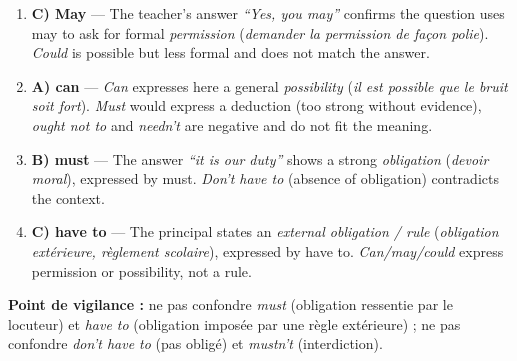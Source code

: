 \documentclass[11pt]{article}
\newcommand{\cle}[1]{{\popxbold\color{popdark}#1}}
\begin{document}
\begin{corrige}

\begin{enumerate}
\item \textbf{C) May} — The teacher's answer \emph{``Yes, you may''} confirms the question uses \cle{may} to ask for formal \emph{permission} (\emph{demander la permission de façon polie}). \emph{Could} is possible but less formal and does not match the answer.

\item \textbf{A) can} — \emph{Can} expresses here a general \emph{possibility} (\emph{il est possible que le bruit soit fort}). \emph{Must} would express a deduction (too strong without evidence), \emph{ought not to} and \emph{needn't} are negative and do not fit the meaning.

\item \textbf{B) must} — The answer \emph{``it is our duty''} shows a strong \emph{obligation} (\emph{devoir moral}), expressed by \cle{must}. \emph{Don't have to} (absence of obligation) contradicts the context.

\item \textbf{C) have to} — The principal states an \emph{external obligation / rule} (\emph{obligation extérieure, règlement scolaire}), expressed by \cle{have to}. \emph{Can/may/could} express permission or possibility, not a rule.
\end{enumerate}

\textbf{Point de vigilance :} ne pas confondre \emph{must} (obligation ressentie par le locuteur) et \emph{have to} (obligation imposée par une règle extérieure) ; ne pas confondre \emph{don't have to} (pas obligé) et \emph{mustn't} (interdiction).
\end{corrige}
\end{document}

